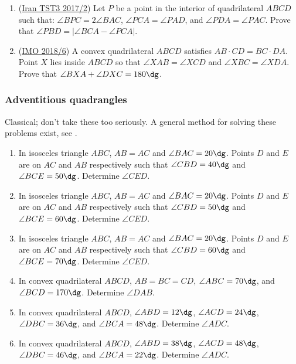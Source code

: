 \documentclass[11pt,paper=letter]{scrartcl}
\begin{document}
\begin{enumerate}
  \item (\href{https://aops.com/community/c6h1437519}{Iran TST3 2017/2}) Let $P$ be a point in the interior of quadrilateral $ABCD$ such that: $\angle BPC = 2\angle BAC$, $\angle PCA = \angle PAD$, and $\angle PDA = \angle PAC$. Prove that $\angle PBD = |\angle BCA - \angle PCA|$.

  \item (\href{https://aops.com/community/c6h1671293}{IMO 2018/6}) A convex quadrilateral $ABCD$ satisfies $AB\cdot CD = BC\cdot DA$. Point $X$ lies inside $ABCD$ so that $\angle{XAB} = \angle{XCD}$ and $\angle XBC = \angle XDA$. Prove that $\angle{BXA} + \angle{DXC} = 180\dg$.
\end{enumerate}

\subsubsection*{Adventitious quadrangles}

Classical; don't take these too seriously. A general method for solving these problems exist, see \cite{B}.

\begin{enumerate}
  \item In isosceles triangle $ABC$, $AB = AC$ and $\angle BAC = 20\dg$. Points $D$ and $E$ are on $AC$ and $AB$ respectively such that $\angle CBD = 40\dg$ and $\angle BCE = 50\dg$. Determine $\angle CED$.

  \item In isosceles triangle $ABC$, $AB = AC$ and $\angle BAC = 20\dg$. Points $D$ and $E$ are on $AC$ and $AB$ respectively such that $\angle CBD = 50\dg$ and $\angle BCE = 60\dg$. Determine $\angle CED$.

  \item In isosceles triangle $ABC$, $AB = AC$ and $\angle BAC = 20\dg$. Points $D$ and $E$ are on $AC$ and $AB$ respectively such that $\angle CBD = 60\dg$ and $\angle BCE = 70\dg$. Determine $\angle CED$.

  \item In convex quadrilateral $ABCD$, $AB = BC = CD$, $\angle ABC = 70\dg$, and $\angle BCD = 170\dg$. Determine $\angle DAB$.

  \item In convex quadrilateral $ABCD$, $\angle ABD = 12\dg$, $\angle ACD = 24\dg$, $\angle DBC = 36\dg$, and $\angle BCA = 48\dg$. Determine $\angle ADC$.

  \item In convex quadrilateral $ABCD$, $\angle ABD = 38\dg$, $\angle ACD = 48\dg$, $\angle DBC = 46\dg$, and $\angle BCA = 22\dg$. Determine $\angle ADC$.
\end{enumerate}
\end{document}
